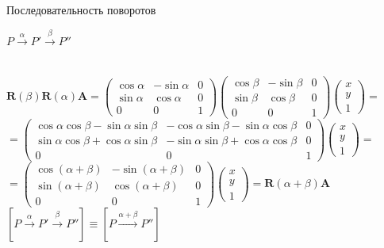 \documentclass[10pt]{beamer}
\begin{document}
\begin{frame}{Последовательность поворотов}
	

	
	$	P \xrightarrow{\alpha} P'  \xrightarrow{\beta} P'' $ \\ ~ \\ \pause
	
	$ \textbf{R}(\beta)\textbf{R}(\alpha) \textbf{A} =
	\begin{pmatrix}
		\cos\alpha&-\sin\alpha&0\\
		\sin\alpha&\cos\alpha&0\\
		0&0&1
	\end{pmatrix} 
	\begin{pmatrix}
		\cos\beta&-\sin\beta&0\\
		\sin\beta&\cos\beta&0\\
		0&0&1
	\end{pmatrix} 
	\begin{pmatrix}
		x\\
		y\\
		1
	\end{pmatrix}
	=
	$ \pause
	$=
	\begin{pmatrix}
		\cos\alpha\cos\beta - \sin\alpha\sin\beta & -\cos\alpha\sin\beta - \sin\alpha\cos\beta & 0 \\
		\sin\alpha\cos\beta + \cos\alpha\sin\beta & -\sin\alpha\sin\beta + \cos\alpha\cos\beta & 0 \\
		0 & 0 & 1
	\end{pmatrix}
	\begin{pmatrix}
		x\\
		y\\
		1
	\end{pmatrix}
	=
	$ \pause
	$
	=
	\begin{pmatrix}
		\cos(\alpha+\beta)&-\sin(\alpha+\beta)&0\\
		\sin(\alpha+\beta)&\cos(\alpha+\beta)&0\\
		0&0&1
	\end{pmatrix} 
	\begin{pmatrix}
	x\\
	y\\
	1
	\end{pmatrix}
	= \textbf{R}(\alpha + \beta)\textbf{A}
	$ \\[1em]
	$ [	P \xrightarrow{\alpha} P' \xrightarrow{\beta} P'' ] \equiv [P \xrightarrow{\alpha+\beta} P'']$ 
	
	
\end{frame}
\end{document}

